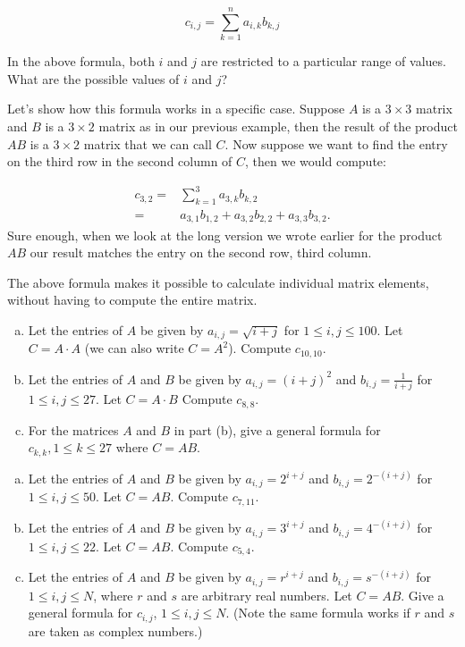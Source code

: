 \[ {c}_{i,j}= \sum_{k=1}^n a_{i,k} b_{k,j} \]


\begin{exercise}{}
In the above formula, both $i$ and $j$ are restricted to a particular range of values.  
What are the possible values of $i$ and $j$?
\end{exercise} 

Let's show how this formula works in a specific case. Suppose ${A}$ is a $3 \times 3$ matrix and ${B}$ is a $3 \times 2$ matrix as in our previous example, then the result of the product ${A} {B}$ is a $3 \times 2 $ matrix that we can call ${C}$.  Now suppose we want to find the entry on the third row in the second column of ${C}$, then we would compute:

\begin{align*}
{c}_{3,2} =& \sum_{k=1}^3 a_{3,k} b_{k,2} \\
=& a_{3,1} b_{1,2} + a_{3,2} b_{2,2} + a_{3,3} b_{3,2}.  
\end{align*}
Sure enough, when we look at the long version we wrote earlier for the product ${AB}$ our result matches the entry on the second row, third column.

The above formula makes it possible to calculate individual matrix elements, without having to compute the entire matrix.

\begin{exercise}{}
\begin{enumerate}[(a)]
\item
Let the entries of $A$ be given by $a_{i,j} = \sqrt{i+j}$ for $1 \le i,j \le 100$. Let $C = A\cdot A$ (we can also write $C=A^2$). Compute $c_{10,10}$.
\item
Let the entries of $A$ and $B$ be given by $a_{i,j} = (i+j)^2$ and $b_{i,j} = \frac{1}{i+j}$ for $1 \le i,j \le 27$. Let $C = A\cdot B$ Compute $c_{8,8}$.
\item
For the matrices $A$ and $B$ in part (b), give a general formula for $c_{k,k}, 1 \le k \le 27$ where $C=AB$.
\end{enumerate}
\end{exercise}

\begin{exercise}{}
\begin{enumerate}[(a)]
\item
Let the entries of $A$ and $B$ be given by $a_{i,j} =2^{i+j}$ and $b_{i,j} =2^{-(i+j)}$ for $1 \le i,j \le 50$. Let $C = AB$.  Compute $c_{7,11}$.
\item
Let the entries of $A$ and $B$ be given by $a_{i,j} =3^{i+j}$ and $b_{i,j} =4^{-(i+j)}$ for $1 \le i,j \le 22$. Let $C = AB$.  Compute $c_{5,4}$.
\item
Let the entries of $A$ and $B$ be given by $a_{i,j} =r^{i+j}$ and $b_{i,j} =s^{-(i+j)}$ for $1 \le i,j \le N$, where $r$ and $s$ are arbitrary real numbers. Let $C = AB$.  Give a general formula for $c_{i,j}$, $1\le i,j \le N$. (Note the same formula works if $r$ and $s$ are taken as complex numbers.) 
\end{enumerate}
\end{exercise}

